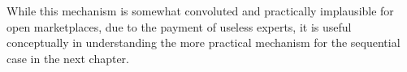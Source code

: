 While this mechanism is somewhat convoluted and practically implausible for open marketplaces, due to the payment of useless experts, it is useful conceptually in understanding the more practical mechanism for the sequential case in the next chapter.







